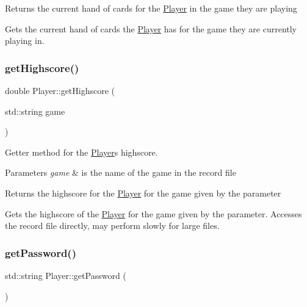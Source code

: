 \begin{DoxyReturn}{Returns}
the current hand of cards for the \hyperlink{classPlayer}{Player} in the game they are playing
\end{DoxyReturn}
Gets the current hand of cards the \hyperlink{classPlayer}{Player} has for the game they are currently playing in. \mbox{\label{classPlayer_a42286b7c54da75f7b64200796f149d4c}} 
\subsubsection{\texorpdfstring{get\+Highscore()}{getHighscore()}}
{\footnotesize\ttfamily double Player\+::get\+Highscore (\begin{DoxyParamCaption}\item[{std\+::string}]{game }\end{DoxyParamCaption})}



Getter method for the \hyperlink{classPlayer}{Player}\textquotesingle{}s highscore. 


\begin{DoxyParams}{Parameters}
{\em game} & is the name of the game in the record file \\
\hline
\end{DoxyParams}
\begin{DoxyReturn}{Returns}
the highscore for the \hyperlink{classPlayer}{Player} for the game given by the parameter
\end{DoxyReturn}
Gets the highscore of the \hyperlink{classPlayer}{Player} for the game given by the parameter. Accesses the record file directly, may perform slowly for large files. \mbox{\label{classPlayer_aef0e6355f59ecc9a72dfda313c603b5e}} 
\subsubsection{\texorpdfstring{get\+Password()}{getPassword()}}
{\footnotesize\ttfamily std\+::string Player\+::get\+Password (\begin{DoxyParamCaption}{ }\end{DoxyParamCaption})}



